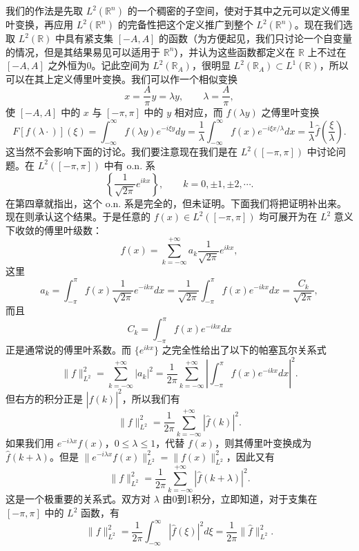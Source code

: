 我们的作法是先取 $L^2(\mathbb R^n)$ 的一个稠密的子空间，使对于其中之元可以定义傅里叶变换，再应用 $L^2(\mathbb R^n)$ 的完备性把这个定义推广到整个 $L^2(\mathbb R^n)$。现在我们选取 $L^2(\mathbb R)$ 中具有紧支集 $[-A,A]$ 的函数（为方便起见，我们只讨论一个自变量的情况，但是其结果易见可以适用于 $\mathbb R^n$），并认为这些函数都定义在 $\mathbb R$ 上不过在 $[-A,A]$ 之外恒为0。记此空间为 $L^2(\mathbb R_A)$，很明显 $L^2(\mathbb R_A)\subset L^1(\mathbb R)$，所以可以在其上定义傅里叶变换。我们可以作一个相似变换
\[
 x=\frac A\pi y=\lambda y,\qquad \lambda=\frac A\pi,
\]
使 $[-A,A]$ 中的 $x$ 与 $[-\pi,\pi]$ 中的 $y$ 相对应，而 $f(\lambda y)$ 之傅里叶变换
\[
 F[f(\lambda\cdot)](\xi)=\int_{-\infty}^{\infty}f(\lambda y)e^{-i\xi y}dy
 =\frac1\lambda\int_{-\infty}^{\infty}f(x)e^{-i\xi x/\lambda}dx
 =\frac1\lambda\widehat f\!\left(\frac\xi\lambda\right).
\]
这当然不会影响下面的讨论。我们要注意现在我们是在 $L^2([ -\pi,\pi])$ 中讨论问题。在 $L^2([ -\pi,\pi])$ 中有 o.n. 系
\[
 \left\{\frac1{\sqrt{2\pi}}e^{ikx}\right\},\qquad k=0,\pm1,\pm2,\cdots.
\]
在第四章就指出，这个 o.n. 系是完全的，但未证明。下面我们将把证明补出来。现在则承认这个结果。于是任意的 $f(x)\in L^2([ -\pi,\pi])$ 均可展开为在 $L^2$ 意义下收敛的傅里叶级数：
\[
 f(x)=\sum_{k=-\infty}^{+\infty}a_k\frac1{\sqrt{2\pi}}e^{ikx},
\]
这里
\[
 a_k=\int_{-\pi}^{\pi}f(x)\frac1{\sqrt{2\pi}}e^{-ikx}dx
 =\frac1{\sqrt{2\pi}}\int_{-\pi}^{\pi}f(x)e^{-ikx}dx
 =\frac{C_k}{\sqrt{2\pi}},
\]
而且
\[
 C_k=\int_{-\pi}^{\pi}f(x)e^{-ikx}dx
\]
正是通常说的傅里叶系数。而 $\{e^{ikx}\}$ 之完全性给出了以下的帕塞瓦尔关系式
\[
 \|f\|_{L^2}^2=\sum_{k=-\infty}^{+\infty}|a_k|^2
 =\frac1{2\pi}\sum_{k=-\infty}^{+\infty}\left|\int_{-\pi}^{\pi}f(x)e^{-ikx}dx\right|^2.
\]
但右方的积分正是 $|\widehat f(k)|^2$，所以我们有
\begin{equation}
 \|f\|_{L^2}^2=\frac1{2\pi}\sum_{k=-\infty}^{+\infty}|\widehat f(k)|^2.
 \tag{27}
\end{equation}
如果我们用 $e^{-i\lambda x}f(x)$，$0\le\lambda\le1$，代替 $f(x)$，则其傅里叶变换成为 $\widehat f(k+\lambda)$。但是 $\|e^{-i\lambda x}f(x)\|_{L^2}^2=\|f(x)\|_{L^2}^2$，因此又有
\begin{equation}
 \|f\|_{L^2}^2=\frac1{2\pi}\sum_{k=-\infty}^{+\infty}|\widehat f(k+\lambda)|^2.
 \tag{28}
\end{equation}
这是一个极重要的关系式。双方对 $\lambda$ 由0到1积分，立即知道，对于支集在 $[-\pi,\pi]$ 中的 $L^2$ 函数，有
\begin{equation}
 \|f\|_{L^2}^2=\frac1{2\pi}\int_{-\infty}^{\infty}|\widehat f(\xi)|^2d\xi
 =\frac1{2\pi}\|\widehat f\|_{L^2}^2.
 \tag{29}
\end{equation}

